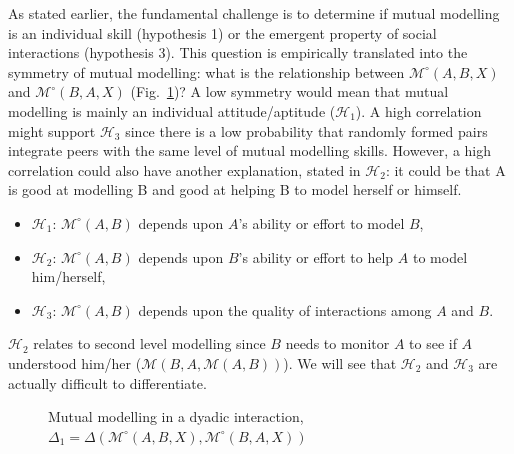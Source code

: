 \documentclass[natbib]{svjour3}
\newcommand{\Model}[3]{{$\mathcal{M}^{\circ}(#1, #2, #3)$}}
\begin{document}
As stated earlier, the fundamental challenge is to determine if mutual modelling is an individual skill (hypothesis 1) or  the emergent property of social interactions (hypothesis 3).  This question is empirically translated into the symmetry of mutual modelling: what is
the relationship between \Model{A}{B}{X} and \Model{B}{A}{X}
(Fig.~\ref{mm_symmetry})? A low symmetry would mean that mutual modelling is
mainly an individual attitude/aptitude ($\mathcal{H}_{1}$). A high correlation
might support $\mathcal{H}_{3}$ since there is a low
probability that randomly formed pairs integrate peers with the same level of
mutual modelling skills. However, a high correlation could also have another explanation, stated in  $\mathcal{H}_{2}$: it could be that A is good at modelling B and good at helping B to model herself or himself.


\begin{itemize}
    \item $\mathcal{H}_{1}$: $\mathcal{M}^{\circ}(A,B)$ depends upon $A$'s ability or effort
        to model $B$,
    
    \item $\mathcal{H}_{2}$: $\mathcal{M}^{\circ}(A,B)$ depends upon  $B$'s ability or
        effort to help $A$ to model him/herself,

    \item $\mathcal{H}_{3}$: $\mathcal{M}^{\circ}(A,B)$ depends upon the quality of
        interactions among $A$ and $B$.

\end{itemize}


$\mathcal{H}_{2}$ relates to second level modelling since $B$ needs to monitor
$A$ to see if $A$ understood him/her ($\mathcal{M}(B,A,\mathcal{M}(A,B))$). We
will see that $\mathcal{H}_{2}$ and $\mathcal{H}_{3}$ are actually difficult to
differentiate.



\begin{figure}[htb]
\centering


\caption{\small Mutual modelling in a dyadic interaction, $\Delta_1 =
    \Delta(\mathcal{M}^{\circ} (A,B,X),
\mathcal{M}^{\circ} (B,A,X))$}

\label{mm_symmetry}
\end{figure}
\end{document}
